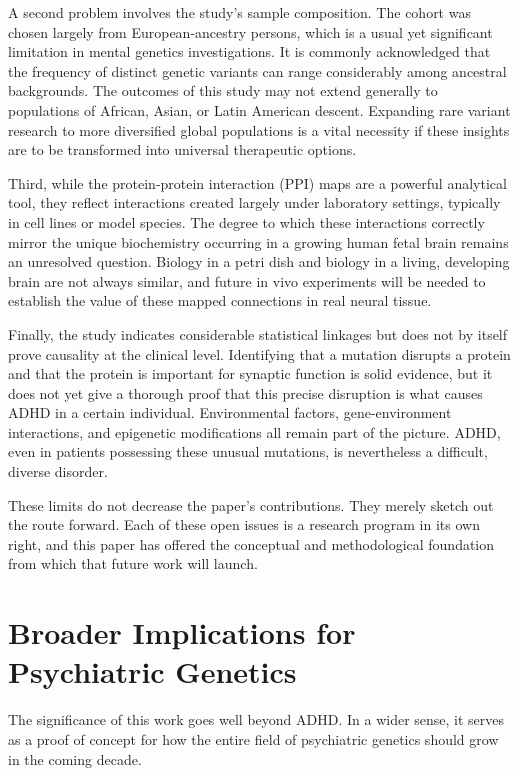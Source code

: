 A second problem involves the study's sample composition.  The cohort was chosen largely from European-ancestry persons, which is a usual yet significant limitation in mental genetics investigations.  It is commonly acknowledged that the frequency of distinct genetic variants can range considerably among ancestral backgrounds.  The outcomes of this study may not extend generally to populations of African, Asian, or Latin American descent.  Expanding rare variant research to more diversified global populations is a vital necessity if these insights are to be transformed into universal therapeutic options.  

Third, while the protein-protein interaction (PPI) maps are a powerful analytical tool, they reflect interactions created largely under laboratory settings, typically in cell lines or model species.  The degree to which these interactions correctly mirror the unique biochemistry occurring in a growing human fetal brain remains an unresolved question.  Biology in a petri dish and biology in a living, developing brain are not always similar, and future in vivo experiments will be needed to establish the value of these mapped connections in real neural tissue.  

Finally, the study indicates considerable statistical linkages but does not by itself prove causality at the clinical level.  Identifying that a mutation disrupts a protein and that the protein is important for synaptic function is solid evidence, but it does not yet give a thorough proof that this precise disruption is what causes ADHD in a certain individual.  Environmental factors, gene-environment interactions, and epigenetic modifications all remain part of the picture.  ADHD, even in patients possessing these unusual mutations, is nevertheless a difficult, diverse disorder.  

These limits do not decrease the paper's contributions.  They merely sketch out the route forward.  Each of these open issues is a research program in its own right, and this paper has offered the conceptual and methodological foundation from which that future work will launch.  

\section{Broader Implications for Psychiatric Genetics}  

The significance of this work goes well beyond ADHD.  In a wider sense, it serves as a proof of concept for how the entire field of psychiatric genetics should grow in the coming decade.  

